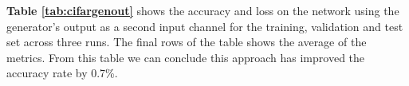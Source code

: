 \documentclass{l4proj}
\begin{document}
\begin{appendices}
\textbf{Table \ref{tab:cifargenout}} shows the accuracy and loss on the network using the generator's output as a second input channel for the training, validation and test set across three runs. The final rows of the table shows the average of the metrics. From this table we can conclude this approach has improved the accuracy rate by 0.7\%.


\end{appendices}





\renewcommand{\thechapter}{0} 

\end{document}
